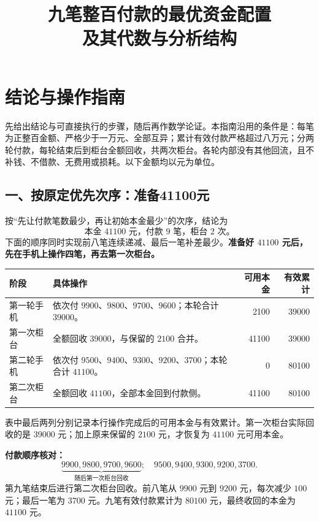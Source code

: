\documentclass[UTF8,a4paper]{ctexbook}
\title{九笔整百付款的最优资金配置\\及其代数与分析结构}
\author{}
\date{}
\theoremstyle{definition}
\numberwithin{equation}{chapter}
\newcommand{\1}{\mathbf{1}}
\begin{document}
\frontmatter
\maketitle
\chapter*{结论与操作指南}
\label{guide:chapter}

先给出结论与可直接执行的步骤，随后再作数学论证。本指南沿用的条件是：每笔为正整百金额、严格少于一万元、全部互异；累计有效付款严格超过八万元；分两轮付款，每轮结束后到柜台全额回收，共两次柜台。各轮内部没有其他回流，且不补钱、不借款、无费用或损耗。以下金额均以元为单位。

\section*{一、按原定优先次序：准备41100元}

按“先让付款笔数最少，再让初始本金最少”的次序，结论为
\[
\boxed{\text{本金 }41100\text{ 元，付款 }9\text{ 笔，柜台 }2\text{ 次。}}
\]
下面的顺序同时实现前八笔连续递减、最后一笔补差最少。\textbf{准备好 $41100$ 元后，先在手机上操作四笔，再去第一次柜台。}

\begingroup
\renewcommand{\arraystretch}{1.35}
\begin{center}
\begin{tabularx}{\textwidth}{@{}p{21mm}Xrr@{}}
\toprule
阶段 & 具体操作 & 可用本金 & 有效累计\\
\midrule
第一轮手机 & 依次付 $9900$、$9800$、$9700$、$9600$；本轮合计 $39000$。 & 2100 & 39000\\
第一次柜台 & 全额回收 $39000$，与保留的 $2100$ 合并。 & 41100 & 39000\\
第二轮手机 & 依次付 $9500$、$9400$、$9300$、$9200$、$3700$；本轮合计 $41100$。 & 0 & 80100\\
第二次柜台 & 全额回收 $41100$，全部本金回到付款侧。 & 41100 & 80100\\
\bottomrule
\end{tabularx}
\end{center}
\endgroup

表中最后两列分别记录本行操作完成后的可用本金与有效累计。第一次柜台实际回收的是 $39000$ 元；加上原来保留的 $2100$ 元，才恢复为 $41100$ 元可用本金。

\noindent\textbf{付款顺序核对：}
\[
\underbrace{9900,9800,9700,9600}_{\text{随后第一次柜台回收}} ;\quad
9500,9400,9300,9200,3700.
\]
第九笔结束后进行第二次柜台回收。前八笔从 $9900$ 元到 $9200$ 元，每次减少 $100$ 元；最后一笔为 $3700$ 元。九笔有效付款累计为 $80100$ 元，最终收回的本金为 $41100$ 元。
\end{document}
